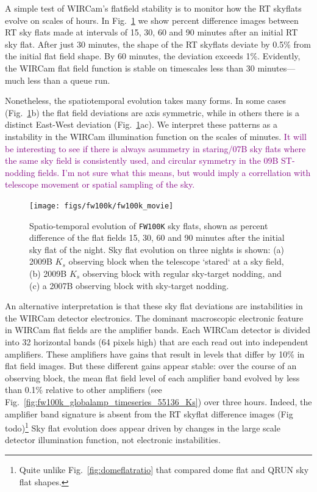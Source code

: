 \documentclass[iop]{emulateapj}
\newcommand{\todo}[1]{\textcolor{RedOrange}{#1}} %
\newcommand{\comment}[1]{\textcolor{purple}{#1}} %
\newcommand{\Fig}[1]{Fig.~\ref{fig:#1}}  %
\begin{document}
A simple test of WIRCam's flatfield stability is to monitor how the RT skyflats evolve on scales of hours.
In \Fig{fw100k_movie} we show percent difference images between RT sky flats made at intervals of 15, 30, 60 and 90 minutes after an initial RT sky flat.
After just 30 minutes, the shape of the RT skyflats deviate by 0.5\% from the initial flat field shape. By 60 minutes, the deviation exceeds 1\%.
Evidently, the WIRCam flat field function is stable on timescales less than 30 minutes---much less than a queue run.

Nonetheless, the spatiotemporal evolution takes many forms.
In some cases (\Fig{fw100k_movie}b) the flat field deviations are axis symmetric, while in others there is a distinct East-West deviation (\Fig{fw100k_movie}ac).
We interpret these patterns as a instability in the WIRCam illumination function on the scales of minutes.
\comment{It will be interesting to see if there is always asummetry in staring/07B sky flats where the same sky field is consistently used, and circular symmetry in the 09B ST-nodding fields. I'm not sure what this means, but would imply a correllation with telescope movement or spatial sampling of the sky.}

\begin{figure}[t]
\centering
\texttt{[image: figs/fw100k/fw100k\_movie]}
\caption{Spatio-temporal evolution of \texttt{FW100K} sky flats, shown as percent difference of the flat fields 15, 30, 60 and 90 minutes after the initial sky flat of the night. Sky flat evolution on three nights is shown: (a) 2009B $K_s$ observing block when the telescope `stared` at a sky field, (b) 2009B $K_s$ observing block with regular sky-target nodding, and (c) a 2007B observing block with sky-target nodding.}
\label{fig:fw100k_movie}
\end{figure}

An alternative interpretation is that these sky flat deviations are instabilities in the WIRCam detector electronics.
The dominant macroscopic electronic feature in WIRCam flat fields are the amplifier bands.
Each WIRCam detector is divided into 32 horizontal bands (64 pixels high) that are each read out into independent amplifiers.
These amplifiers have gains that result in levels that differ by 10\% in flat field images.
But these different gains appear stable: over the course of an observing block, the mean flat field level of each amplifier band evolved by less than 0.1\% relative to other amplifiers (see \Fig{fw100k_globalamp_timeseries_55136_Ks}) over three hours.
Indeed, the amplifier band signature is absent from the RT skyflat difference images (Fig \todo{todo})\footnote{Quite unlike \Fig{domeflatratio} that compared dome flat and QRUN sky flat shapes.}
Sky flat evolution does appear driven by changes in the large scale detector illumination function, not electronic instabilities.
\end{document}
